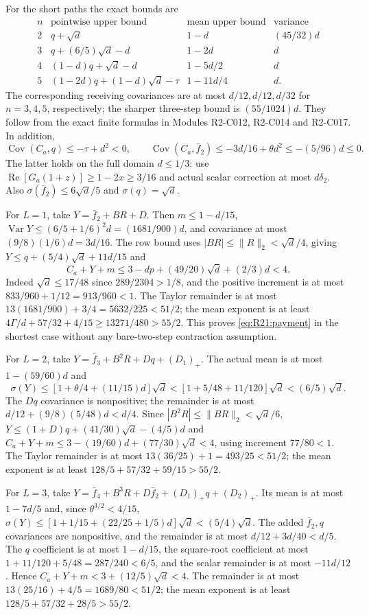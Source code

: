 For the short paths the exact bounds are
\[
\begin{array}{c|c|c|c}
n&\text{pointwise upper bound}&\text{mean upper bound}&\text{variance}\\\hline
2&q+\sqrt d&1-d&(45/32)d\\
3&q+(6/5)\sqrt d-d&1-2d&d\\
4&(1-d)q+\sqrt d-d&1-5d/2&d\\
5&(1-2d)q+(1-d)\sqrt d-\tau&1-11d/4&d.
\end{array}
\]
The corresponding receiving covariances are at most $d/12,d/12,d/32$
for $n=3,4,5$, respectively; the sharper three-step bound is
$(55/1024)d$. They follow from the exact finite formulas in Modules
R2-C012, R2-C014 and R2-C017. In addition,
\begin{equation}\tag{R21.4.1}\label{eq:R21:favorable}
\operatorname{Cov}(C_a,q)\le-\tau+d^2<0,\qquad
\operatorname{Cov}(C_a,\bar f_2)
\le-3d/16+\theta d^2\le-(5/96)d\le0.
\end{equation}
The latter holds on the full domain $d\le1/3$: use
$\operatorname{Re}[G_a(1+z)]\ge1-2x\ge3/16$ and actual scalar
correction at most $d\delta_2$. Also
$\sigma(\bar f_2)\le6\sqrt d/5$ and $\sigma(q)=\sqrt d$.

For $L=1$, take $Y=\bar f_2+BR+D$.
Then $m\le1-d/15$,
$\operatorname{Var}Y\le(6/5+1/6)^2d=(1681/900)d$,
and covariance at most $(9/8)(1/6)d=3d/16$.
The row bound uses $|BR|\le\|R\|_2<\sqrt d/4$, giving
$Y\le q+(5/4)\sqrt d+11d/15$ and
\[
C_a+Y+m\le3-dp+(49/20)\sqrt d+(2/3)d<4.
\]
Indeed $\sqrt d\le17/48$ since $289/2304>1/8$, and the positive
increment is at most $833/960+1/12=913/960<1$.
The Taylor remainder is at most
$13(1681/900)+3/4=5632/225<51/2$;
the mean exponent is at least
$4\Gamma/d+57/32+4/15\ge13271/480>55/2$.
This proves \eqref{eq:R21:payment} in the shortest case without any
bare-two-step contraction assumption.

For $L=2$, take $Y=\bar f_3+B^2R+Dq+(D_1)_+$.
The actual mean is at most $1-(59/60)d$ and
\[
\sigma(Y)\le[1+\theta/4+(11/15)d]\sqrt d
<[1+5/48+11/120]\sqrt d<(6/5)\sqrt d.
\]
The $Dq$ covariance is nonpositive; the remainder is at most
$d/12+(9/8)(5/48)d<d/4$.
Since $|B^2R|\le\|BR\|_2<\sqrt d/6$,
$Y\le(1+D)q+(41/30)\sqrt d-(4/5)d$ and
$C_a+Y+m\le3-(19/60)d+(77/30)\sqrt d<4$,
using increment $77/80<1$.
The Taylor remainder is at most $13(36/25)+1=493/25<51/2$;
the mean exponent is at least $128/5+57/32+59/15>55/2$.

For $L=3$, take
$Y=\bar f_4+B^3R+D\bar f_2+(D_1)_+q+(D_2)_+$.
Its mean is at most $1-7d/5$ and, since $\theta^{3/2}<4/15$,
$\sigma(Y)\le[1+1/15+(22/25+1/5)d]\sqrt d<(5/4)\sqrt d$.
The added $\bar f_2,q$ covariances are nonpositive, and the remainder
is at most $d/12+3d/40<d/5$.
The $q$ coefficient is at most $1-d/15$, the square-root coefficient
at most $1+11/120+5/48=287/240<6/5$, and the scalar remainder is
at most $-11d/12$. Hence $C_a+Y+m<3+(12/5)\sqrt d<4$.
The remainder is at most $13(25/16)+4/5=1689/80<51/2$;
the mean exponent is at least $128/5+57/32+28/5>55/2$.


